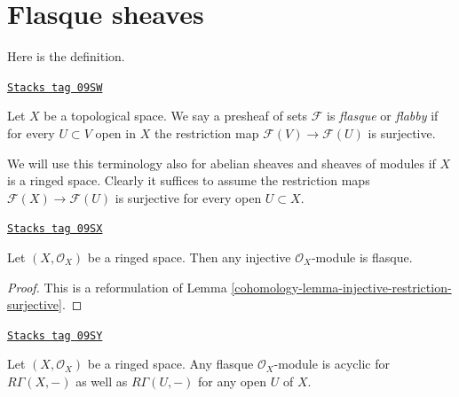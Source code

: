 \section{Flasque sheaves}
\label{cohomology-section-flasque}
Here is the definition.

\begin{definition}[Flasque]
\label{cohomology-definition-flasque}
\href{https://stacks.math.columbia.edu/tag/09SW}{\texttt{Stacks tag 09SW}}

Let $X$ be a topological space. We say a presheaf of sets
$\mathcal{F}$ is {\it flasque} or {\it flabby} if for every
$U \subset V$ open in $X$ the restriction map
$\mathcal{F}(V) \to \mathcal{F}(U)$ is surjective.
\end{definition}

We will use this terminology also for abelian sheaves and
sheaves of modules if $X$ is a ringed space.
Clearly it suffices to assume the restriction maps
$\mathcal{F}(X) \to \mathcal{F}(U)$ is surjective for every
open $U \subset X$.

\begin{lemma}
\label{cohomology-lemma-injective-flasque}
\href{https://stacks.math.columbia.edu/tag/09SX}{\texttt{Stacks tag 09SX}}

Let $(X, \mathcal{O}_X)$ be a ringed space.
Then any injective $\mathcal{O}_X$-module is flasque.
\end{lemma}

\begin{proof}

This is a reformulation of Lemma \ref{cohomology-lemma-injective-restriction-surjective}.
\end{proof}

\begin{lemma}
\label{cohomology-lemma-flasque-acyclic}
\href{https://stacks.math.columbia.edu/tag/09SY}{\texttt{Stacks tag 09SY}}

Let $(X, \mathcal{O}_X)$ be a ringed space. Any flasque $\mathcal{O}_X$-module
is acyclic for $R\Gamma(X, -)$ as well as $R\Gamma(U, -)$ for any
open $U$ of $X$.
\end{lemma}

